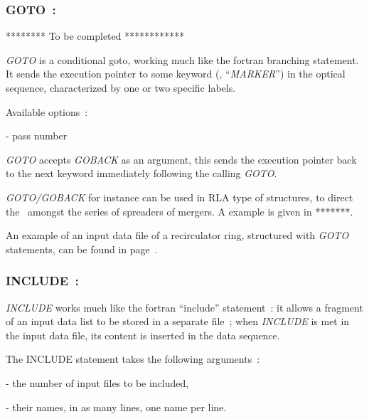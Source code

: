 {\newpage

\subsubsection*{GOTO~: \GOTOTitl~\cite{Pavel}} \label{GOTO} 
\medskip

******** To be completed ************

\noindent \textsl{GOTO} is a conditional goto, working much like the fortran branching statement. 
It sends the execution pointer to some keyword (\eg, ``\textsl{MARKER}'') 
in the optical sequence,  characterized by one or two specific labels. 

\medskip

\noindent Available options~: 

- pass number

\textsl{GOTO} accepts \textsl{GOBACK}  as an argument, this sends  the execution pointer back to the next  
keyword immediately following the calling \textsl{GOTO}. 

\medskip

\textsl{GOTO/GOBACK} for instance can be used  in RLA type of structures, to direct the \zgoubi\ amongst 
the series of spreaders of mergers. A example is given in *******. 

\medskip

\noindent An example of an input data file of a recirculator ring, structured with \textsl{GOTO} statements, 
can be found in page~\pageref{ExaINCLUDE-GOTO}. 




\newpage

\subsubsection*{INCLUDE~: \INCLUDETitl} \label{INCLUDE} 
\medskip

\medskip

\noindent \textsl{INCLUDE} works much like the fortran ``include'' statement~: 
it allows a fragment of an input data list to be stored in a separate file~; 
when  \textsl{INCLUDE} is met in the input data file, its content is inserted in 
the data sequence. 

\noindent The INCLUDE statement takes the following arguments~: 

- the number of input files to be included, 

- their names, in as many lines, one name per line. 

}
